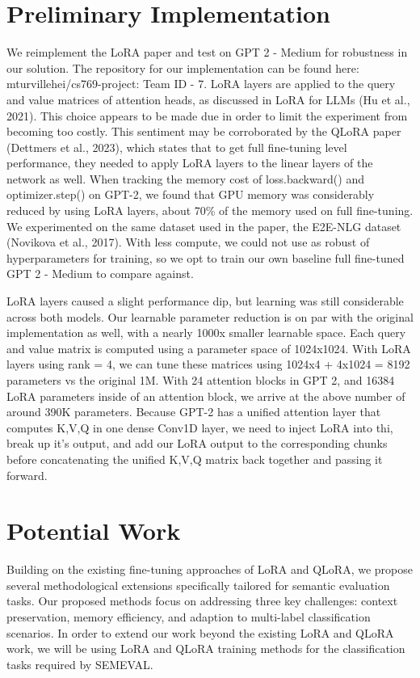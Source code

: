\documentclass[11pt]{article}
\begin{document}
\section{Preliminary Implementation}

We reimplement the LoRA paper and test on GPT 2 - Medium for robustness in our solution. The repository for our implementation can be found here: mturvillehei/cs769-project: Team ID - 7.
LoRA layers are applied to the query and value matrices of attention heads, as discussed in LoRA for LLMs (Hu et al., 2021). This choice appears to be made due in order to limit the experiment from becoming too costly. This sentiment may be corroborated by the QLoRA paper (Dettmers et al., 2023), which states that to get full fine-tuning level performance, they needed to apply LoRA layers to the linear layers of the network as well. When tracking the memory cost of loss.backward() and optimizer.step() on GPT-2, we found that GPU memory was considerably reduced by using LoRA layers, about 70\% of the memory used on full fine-tuning. We experimented on the same dataset used in the paper, the E2E-NLG dataset (Novikova et al., 2017). With less compute, we could not use as robust of hyperparameters for training, so we opt to train our own baseline full fine-tuned GPT 2 - Medium to compare against.

LoRA layers caused a slight performance dip, but learning was still considerable across both models. Our learnable parameter reduction is on par with the original implementation as well, with a nearly 1000x smaller learnable space. Each query and value matrix is computed using a parameter space of 1024x1024. With LoRA layers using rank = 4, we can tune these matrices using 1024x4 + 4x1024 = 8192 parameters vs the original 1M. With 24 attention blocks in GPT 2, and 16384 LoRA parameters inside of an attention block, we arrive at the above number of around 390K parameters. Because GPT-2 has a unified attention layer that computes K,V,Q in one dense Conv1D layer, we need to inject LoRA into thi, break up it’s output, and add our LoRA output to the corresponding chunks before concatenating the unified K,V,Q matrix back together and passing it forward.


\section{Potential Work}

Building on the existing fine-tuning approaches of LoRA and QLoRA, we propose several methodological extensions specifically tailored for semantic evaluation tasks. Our proposed methods focus on addressing three key challenges: context preservation, memory efficiency, and adaption to multi-label classification scenarios. In order to extend our work beyond the existing LoRA and QLoRA work, we will be using LoRA and QLoRA training methods for the classification tasks required by SEMEVAL. 
\end{document}
